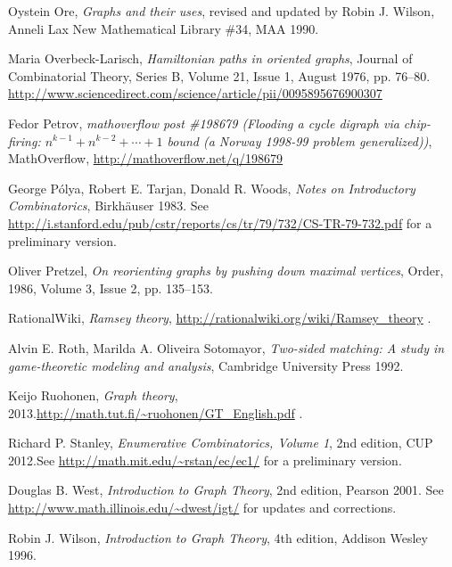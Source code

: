 \documentclass[numbers=enddot,12pt,final,onecolumn,notitlepage]{scrartcl}%
\theoremstyle{definition}
\begin{document}
\begin{thebibliography}{9999999999}
Oystein Ore, \textit{Graphs and their uses}, revised and updated by
Robin J. Wilson,
Anneli Lax New Mathematical Library \#34, MAA 1990.

Maria Overbeck-Larisch,
\textit{Hamiltonian paths in oriented graphs},
Journal of Combinatorial Theory, Series B,
Volume 21, Issue 1, August 1976, pp. 76--80.
\newline \url{http://www.sciencedirect.com/science/article/pii/0095895676900307}

Fedor Petrov,
\textit{mathoverflow post \#198679 (Flooding a cycle digraph via
chip-firing: $n^{k-1} + n^{k-2} + \cdots + 1$ bound (a Norway 1998-99
problem generalized))},
MathOverflow,
\newline \url{http://mathoverflow.net/q/198679}

George P\'olya, Robert E. Tarjan,
Donald R. Woods,
\textit{Notes on Introductory Combinatorics},
Birkh\"auser 1983.
\newline See
\url{http://i.stanford.edu/pub/cstr/reports/cs/tr/79/732/CS-TR-79-732.pdf}
for a preliminary version.

Oliver Pretzel,
\textit{On reorienting graphs by pushing down maximal vertices},
Order, 1986, Volume 3, Issue 2, pp. 135--153.

RationalWiki,
\textit{Ramsey theory},
\url{http://rationalwiki.org/wiki/Ramsey_theory} .

Alvin E. Roth, Marilda A. Oliveira
Sotomayor, \textit{Two-sided matching: A study in game-theoretic
modeling and analysis}, Cambridge University Press 1992.

Keijo Ruohonen, \textit{Graph theory},
2013.\newline \url{http://math.tut.fi/~ruohonen/GT_English.pdf} .

Richard P. Stanley, \textit{Enumerative
Combinatorics, Volume 1}, 2nd edition, CUP 2012.\newline See
\url{http://math.mit.edu/~rstan/ec/ec1/} for a preliminary version.

Douglas B. West,
\textit{Introduction to Graph Theory}, 2nd edition, Pearson 2001.
\newline See \url{http://www.math.illinois.edu/~dwest/igt/}
for updates and corrections.

Robin J. Wilson,
\textit{Introduction to Graph Theory}, 4th edition,
Addison Wesley 1996.

\end{thebibliography}
\end{document}

